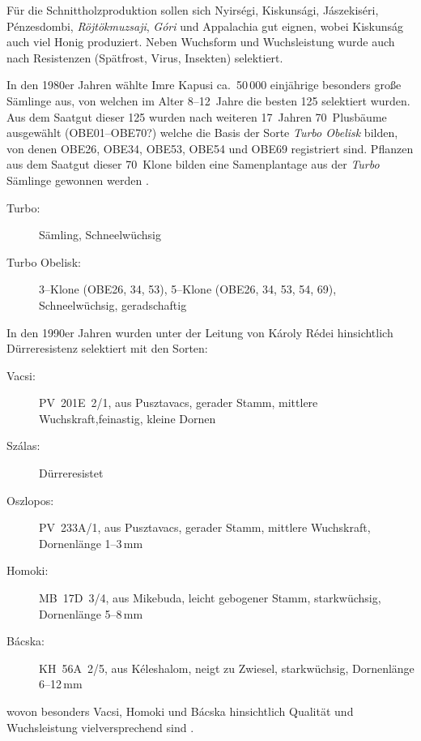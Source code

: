 \documentclass[twocolumn]{scrartcl}
\begin{document}
Für die Schnittholzproduktion sollen sich Nyirségi, Kiskunsági, Jászekiséri,
Pénzesdombi, \emph{Röjtökmuzsaji}, \emph{Góri} und Appalachia gut eignen, wobei
Kiskunság auch viel Honig produziert. Neben Wuchsform und Wuchsleistung wurde
auch nach Resistenzen (Spätfrost, Virus, Insekten) selektiert.

In den 1980er Jahren wählte Imre Kapusi ca.\ 50\,000 einjährige
besonders große Sämlinge aus, von welchen im Alter 8--12~Jahre die
besten 125 selektiert wurden. Aus dem Saatgut dieser 125 wurden nach
weiteren 17~Jahren 70~Plusbäume ausgewählt (OBE01--OBE70?) welche die
Basis der Sorte \emph{Turbo Obelisk} bilden, von denen OBE26, OBE34,
OBE53, OBE54 und OBE69 registriert sind.
Pflanzen aus dem Saatgut dieser 70~Klone
bilden eine Samenplantage aus der \emph{Turbo} Sämlinge gewonnen
werden \citep{nemeth2022robinie}.

\begin{description}
  \item[Turbo:] Sämling, Schneelwüchsig \citep{nemeth2022robinie}
  \item[Turbo Obelisk:] 3--Klone (OBE26, 34, 53), 5--Klone (OBE26, 34, 53, 54, 69), Schneelwüchsig, geradschaftig \citep{nemeth2022robinie}
\end{description}

In den 1990er Jahren wurden unter der Leitung von Károly Rédei
hinsichtlich Dürreresistenz selektiert mit den Sorten:
\begin{description}
  \item[Vacsi:] PV~201E~2/1, aus Pusztavacs, gerader Stamm, mittlere Wuchskraft,feinastig, kleine Dornen
  \item[Szálas:] Dürreresistet
  \item[Oszlopos:] PV~233A/1, aus Pusztavacs, gerader Stamm, mittlere Wuchskraft, Dornenlänge 1--3\,mm
  \item[Homoki:] MB~17D~3/4, aus Mikebuda, leicht gebogener Stamm, starkwüchsig, Dornenlänge 5--8\,mm
  \item[Bácska:] KH~56A~2/5, aus Kéleshalom, neigt zu Zwiesel, starkwüchsig, Dornenlänge 6--12\,mm
\end{description}
wovon besonders Vacsi, Homoki
und Bácska hinsichtlich Qualität und Wuchsleistung vielversprechend
sind \citep{keserue2021robinie,abri2023robinieUngarn,abri2024dis}.
\end{document}
